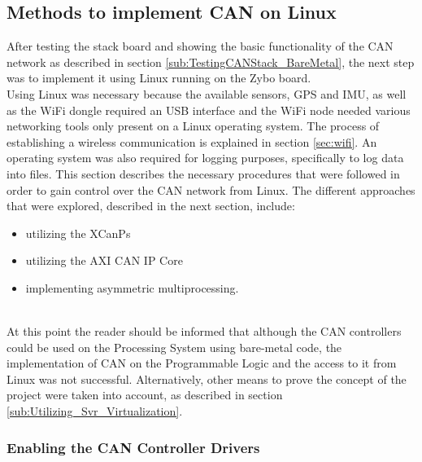 \subsection{Methods to implement CAN on Linux}\label{sec:methods_to_implement_can}


After testing the stack board and showing the basic functionality of the CAN network as described in section \ref{sub:TestingCANStack_BareMetal}, the next step was to implement it using Linux running on the Zybo board.\\
Using Linux was necessary because the available sensors, GPS and IMU, as well as the WiFi dongle required an USB interface and the WiFi node needed various networking tools only present on a Linux operating system.
The process of establishing a wireless communication is explained in section \ref{sec:wifi}.
An operating system was also required for logging purposes, specifically to log data into files.
This section describes the necessary procedures that were followed in order to gain control over the CAN network from Linux.
The different approaches that were explored, described in the next section, include:
\begin{itemize}
\item utilizing the XCanPs
\item utilizing the AXI CAN IP Core
\item implementing asymmetric multiprocessing.
\end{itemize}
~\\
At this point the reader should be informed that although the CAN controllers could be used on the Processing System using bare-metal code, the implementation of CAN on the Programmable Logic and the access to it from Linux was not successful.
Alternatively, other means to prove the concept of the project were taken into account, as described in section \ref{sub:Utilizing_Svr_Virtualization}.

\subsubsection*{Enabling the CAN Controller Drivers}

